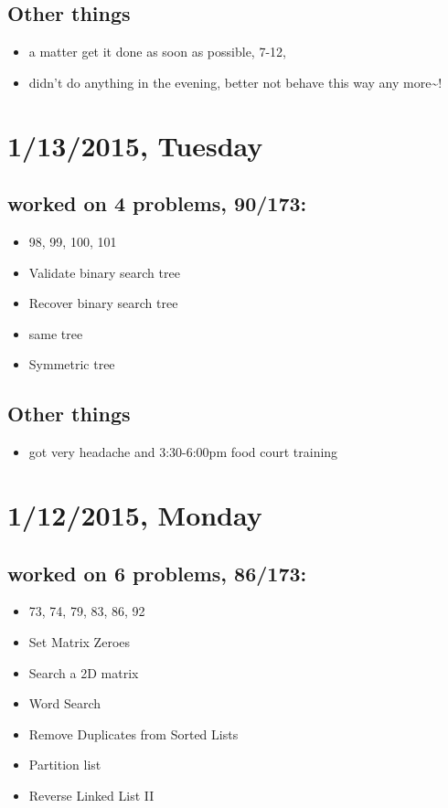 \documentclass[9pt,b5paper]{article}
\begin{document}
\subsection{Other things}
\label{sec-10-2}
\begin{itemize}
\item a matter get it done as soon as possible, 7-12,
\item didn't do anything in the evening, better not behave this way any more\textasciitilde{}!
\end{itemize}
\section{1/13/2015, Tuesday}
\label{sec-11}
\subsection{worked on 4 problems, 90/173:}
\label{sec-11-1}
\begin{itemize}
\item 98, 99, 100, 101
\item Validate binary search tree
\item Recover binary search tree
\item same tree
\item Symmetric tree
\end{itemize}
\subsection{Other things}
\label{sec-11-2}
\begin{itemize}
\item got very headache and 3:30-6:00pm food court training
\end{itemize}
\section{1/12/2015, Monday}
\label{sec-12}
\subsection{worked on 6 problems, 86/173:}
\label{sec-12-1}
\begin{itemize}
\item 73, 74, 79, 83, 86, 92
\item Set Matrix Zeroes
\item Search a 2D matrix
\item Word Search
\item Remove Duplicates from Sorted Lists
\item Partition list
\item Reverse Linked List II
\end{itemize}
\end{document}

